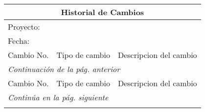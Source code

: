 


\newenvironment{changelog}
{ 
    \begin{center}
    \begin{longtable}{|m{2cm}|l|m{10cm}|}
    \hline
    \multicolumn{3}{|c|}{Historial de Cambios}\\ \hline 
    \multicolumn{3}{|l|}{Proyecto: \proyecto} \\ 
    \multicolumn{3}{|l|}{Fecha: \fecha} \\ \hline
    Cambio No. & Tipo de cambio & Descripcion del cambio\\ \hline 
    \endfirsthead
    \multicolumn{3}{|l|}{\textit{Continuación de la pág. anterior}} \\ \hline
    Cambio No. & Tipo de cambio & Descripcion del cambio\\ \hline 
    \endhead
    \hline \multicolumn{3}{|l|}{\textit{Continúa en la pág. siguiente}} \\ \hline
    \endfoot
    \hline
    \endlastfoot
}
{
    \end{longtable}
    \end{center}
}

\begin{changelog}

\end{changelog}